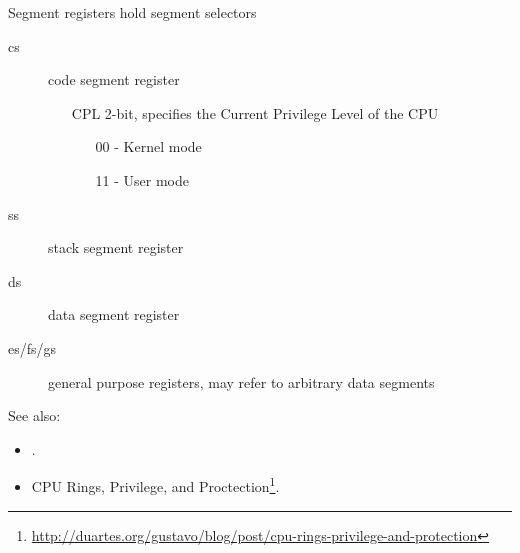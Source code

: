 \begin{frame}
  \begin{block}{Segment registers hold segment selectors}
    \begin{description}
    \item[cs] code segment register
      \begin{itemize}
      \item[CPL] 2-bit, specifies the Current Privilege Level of the CPU
        \begin{itemize}
        \item[00] - Kernel mode
        \item[11] - User mode
        \end{itemize}
      \end{itemize}
    \item[ss] stack segment register
    \item[ds] data segment register
    \item[es/fs/gs] general purpose registers, may refer to arbitrary data segments
    \end{description}
  \end{block}
\end{frame}

See also:
\begin{itemize}
\item {}.
\item CPU Rings, Privilege, and Proctection\footnote{\url{http://duartes.org/gustavo/blog/post/cpu-rings-privilege-and-protection}}.
\end{itemize}

